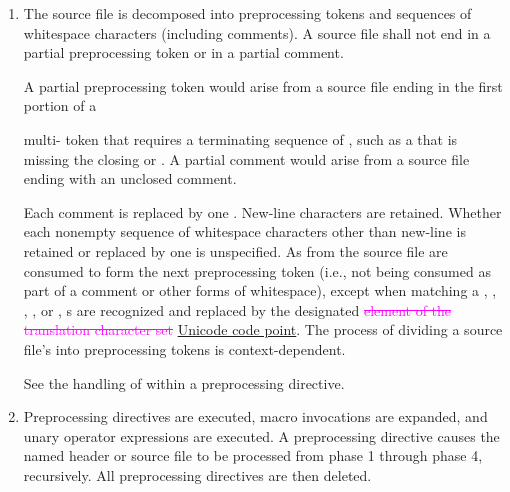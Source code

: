 \documentclass{wg21}
\newcommand{\addedTranslation}[1]{\textcolor{addclrTwo}{\uline{#1}}}
\newcommand{\removedTranslation}[1]{\textcolor{magenta}{\sout{#1}}}
\newcommand{\changedTranslation}[2]{\removedTranslation{#1} \addedTranslation{#2}}
\begin{document}
\begin{enumerate}
    \item The source file is decomposed into preprocessing
    tokens and sequences of whitespace characters
    (including comments). A source file shall not end in a partial
    preprocessing token or in a partial comment.
    \begin{wfootnote}
        A partial preprocessing
        token would arise from a source file
        ending in the first portion of a %



        multi- token that requires a
        terminating sequence of , such as a 
        that is missing the closing 
        or \tcode{>}. A partial comment
        would arise from a source file ending with an unclosed \tcode{/*}
        comment.
    \end{wfootnote}
    Each comment is replaced by one . New-line characters are
    retained. Whether each nonempty sequence of whitespace characters other
    than new-line is retained or replaced by one  is
    unspecified.
    As  from the source file are consumed
    to form the next preprocessing token
    (i.e., not being consumed as part of a comment or other forms of whitespace),
    except when matching a
    ,
    ,
    ,
    , or
    ,
    s are recognized and
    replaced by the designated \changedTranslation{element of the translation character set}{Unicode code point}.
    The process of dividing a source file's
     into preprocessing tokens is context-dependent.
    \begin{example}
        See the handling of \tcode{<} within a  preprocessing
        directive.
    \end{example}

    \item Preprocessing directives are executed, macro invocations are
    expanded, and  unary operator expressions are executed.
    A  preprocessing directive causes the named header or
    source file to be processed from phase 1 through phase 4, recursively.
    All preprocessing directives are then deleted.


\end{enumerate}
\end{document}
